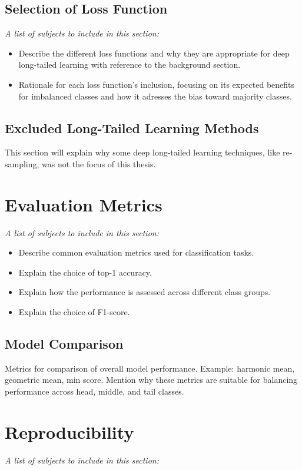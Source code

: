\subsection{Selection of Loss Function}
\textit{A list of subjects to include in this section:}

 \begin{itemize}
    \item Describe the different loss functions and why they are appropriate for deep long-tailed learning with reference to the background section.
    \item Rationale for each loss function's inclusion, focusing on its expected benefits for imbalanced classes and how it adresses the bias toward majority classes.
 \end{itemize}

\subsection{Excluded Long-Tailed Learning Methods}
This section will explain why some deep long-tailed learning techniques, like re-sampling, was not the focus of this thesis.

\section{Evaluation Metrics}
\textit{A list of subjects to include in this section:}

\begin{itemize}
    \item Describe common evaluation metrics used for classification tasks.
    \item Explain the choice of top-1 accuracy.
    \item Explain how the performance is assessed across different class groups.
    \item Explain the choice of F1-score.
\end{itemize}

\subsection{Model Comparison}
Metrics for comparison of overall model performance. Example: harmonic mean, geometric mean, min score. Mention why these metrics are suitable for balancing performance across head, middle, and tail classes.

\section{Reproducibility}
\textit{A list of subjects to include in this section:}

